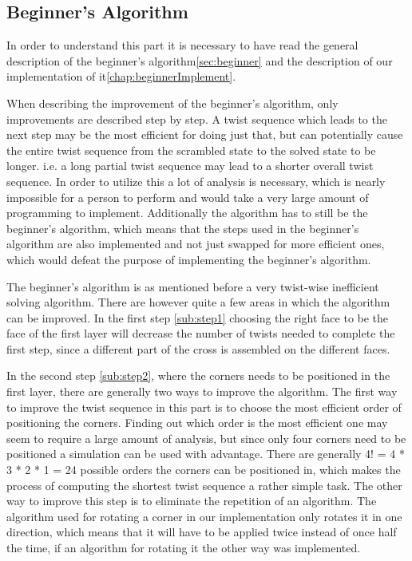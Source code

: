 

\subsection{Beginner's Algorithm} %
In order to understand this part it is necessary to have read the general description of the beginner's algorithm\ref{sec:beginner} and the description of our implementation of it\ref{chap:beginnerImplement}. 

When describing the improvement of the beginner's algorithm, only improvements are described step by step. 
A twist sequence which leads to the next step may be the most efficient for doing just that, but can potentially cause the entire twist sequence from the scrambled state to the solved state to be longer. 
i.e. a long partial twist sequence may lead to a shorter overall twist sequence. In order to utilize this a lot of analysis is necessary, which is nearly impossible for a person to perform and would take a very large amount of programming to implement.
Additionally the algorithm has to still be the beginner's algorithm, which means that the steps used in the beginner's algorithm are also implemented and not just swapped for more efficient ones, which would defeat the purpose of implementing the beginner's algorithm.


The beginner's algorithm is as mentioned before a very twist-wise inefficient solving algorithm. 
There are however quite a few areas in which the algorithm can be improved.
In the first step \ref{sub:step1} choosing the right face to be the face of the first layer will decrease the number of twists needed to complete the first step, since a different part of the cross is assembled on the different faces.

In the second step \ref{sub:step2}, where the corners needs to be positioned in the first layer, there are generally two ways to improve the algorithm.
The first way to improve the twist sequence in this part is to choose the most efficient order of positioning the corners.
Finding out which order is the most efficient one may seem to require a large amount of analysis, but since only four corners need to be positioned a simulation can be used with advantage. %
There are generally 4! = 4 * 3 * 2 * 1 = 24 possible orders the corners can be positioned in, which makes the process of computing the shortest twist sequence a rather simple task. %
The other way to improve this step is to eliminate the repetition of an algorithm. The algorithm used for rotating a corner \cpiece{} in our implementation only rotates it in one direction, which means that it will have to be applied twice instead of once half the time, if an algorithm for rotating it the other way was implemented.

